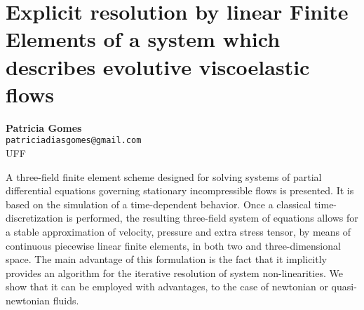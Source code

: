 
\section{Explicit resolution by linear Finite Elements of a system which describes evolutive viscoelastic flows}

\textbf{Patricia Gomes}\\
\texttt{\small{patriciadiasgomes@gmail.com}}\\
UFF

A three-field finite element scheme designed for solving systems of partial differential equations governing stationary incompressible flows is presented. It is based on the simulation of a time-dependent behavior. Once a classical time-discretization is performed, the resulting three-field system of equations allows for a stable approximation of velocity, pressure and extra stress tensor, by means of continuous piecewise linear finite elements, in both two and three-dimensional space. The main advantage of this formulation is the fact that it implicitly provides an algorithm for the iterative resolution of system non-linearities. We show that it can be employed with advantages, to the case of newtonian or quasi-newtonian fluids.

